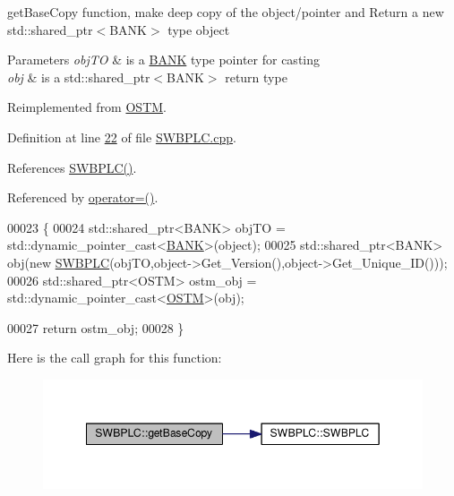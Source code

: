 get\+Base\+Copy function, make deep copy of the object/pointer and Return a new std\+::shared\+\_\+ptr$<$\+B\+A\+N\+K$>$ type object 


\begin{DoxyParams}{Parameters}
{\em obj\+TO} & is a \hyperlink{class_b_a_n_k}{B\+A\+NK} type pointer for casting \\
\hline
{\em obj} & is a std\+::shared\+\_\+ptr$<$\+B\+A\+N\+K$>$ return type \\
\hline
\end{DoxyParams}


Reimplemented from \hyperlink{class_o_s_t_m_a0bfa3763bd441407dd6365f42714f94c_a0bfa3763bd441407dd6365f42714f94c}{O\+S\+TM}.



Definition at line \hyperlink{_s_w_b_p_l_c_8cpp_source_l00022}{22} of file \hyperlink{_s_w_b_p_l_c_8cpp_source}{S\+W\+B\+P\+L\+C.\+cpp}.



References \hyperlink{_s_w_b_p_l_c_8h_source_l00024}{S\+W\+B\+P\+L\+C()}.



Referenced by \hyperlink{_s_w_b_p_l_c_8h_source_l00063}{operator=()}.


\begin{DoxyCode}
00023 \{
00024     std::shared\_ptr<BANK> objTO = std::dynamic\_pointer\_cast<\hyperlink{class_b_a_n_k}{BANK}>(object);
00025     std::shared\_ptr<BANK> obj(\textcolor{keyword}{new} \hyperlink{class_s_w_b_p_l_c_a320f4e2b023038668d941ce5d0c46aeb_a320f4e2b023038668d941ce5d0c46aeb}{SWBPLC}(objTO,object->Get\_Version(),\textcolor{keywordtype}{object}->Get\_Unique\_ID())); 
00026     std::shared\_ptr<OSTM> ostm\_obj = std::dynamic\_pointer\_cast<\hyperlink{class_o_s_t_m}{OSTM}>(obj);                             
           
00027     \textcolor{keywordflow}{return} ostm\_obj;
00028 \}
\end{DoxyCode}


Here is the call graph for this function\+:\nopagebreak
\begin{figure}[H]
\begin{center}
\leavevmode
\includegraphics[width=349pt]{class_s_w_b_p_l_c_a77f0e0d6c08a95066d277bf6b2073a5c_a77f0e0d6c08a95066d277bf6b2073a5c_cgraph}
\end{center}
\end{figure}


